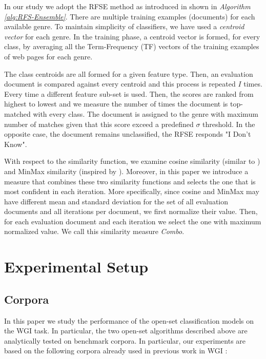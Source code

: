 \documentclass[runningheads]{llncs}
\begin{document}
\hfill \break

In our study we adopt the RFSE method as introduced in \citep{pritsos2013open} shown in \textit{Algorithm \ref{alg:RFS-Ensemble}}. There are multiple training examples (documents) for each available genre. To maintain simplicity of classifiers, we have used a \textit{centroid vector} for each genre. In the training phase, a centroid vector is formed, for every class, by averaging all the Term-Frequency (TF) vectors of the training examples of web pages for each genre.

The class centroids are all formed for a given feature type. Then, an evaluation document is compared against every centroid and this process is repeated $I$ times. Every time a different feature sub-set is used. Then, the scores are ranked from highest to lowest and we measure the number of times the document is top-matched with every class. The document is assigned to the genre with maximum number of matches given that this score exceed a predefined $\sigma$ threshold. In the opposite case, the document remains unclassified, the RFSE responds "I Don't Know".


With respect to the similarity function, we examine cosine similarity (similar to \citep{pritsos2013open}) and MinMax similarity (inspired by \citep{koppel2014determining}). Moreover, in this paper we introduce a measure that combines these two similarity functions and selects the one that is most confident in each iteration. More specifically, since cosine and MinMax may have different mean and standard deviation for the set of all evaluation documents and all iterations per document, we first normalize their value. Then, for each evaluation document and each iteration we select the one with maximum normalized value. We call this similarity measure \textit{Combo}.

\section{Experimental Setup}\label{sec:experimental_setup}
\subsection{Corpora}\label{sec:corpora}
In this paper we study the performance of the open-set classification models on the WGI task. In particular, the two open-set algorithms described above are analytically tested on benchmark corpora. In particular, our experiments are based on the following corpora already used in previous work in WGI \citep{meyer2004genre,santini2007automatic,kanaris2009learning}:
\end{document}
